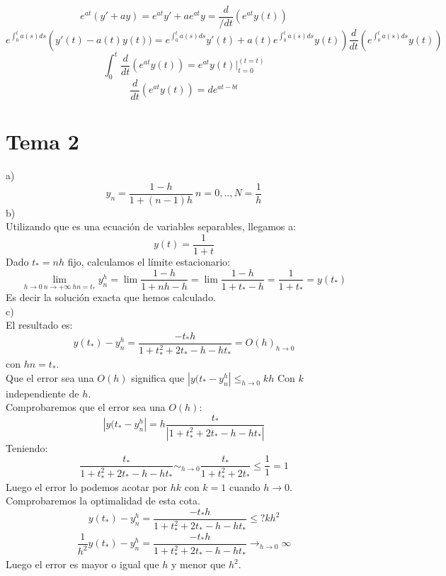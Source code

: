 \documentclass[openany]{book}
\begin{document}
    \setcounter{ex}{8}

    \begin{exercise}
        $$ e^{at}(y'+ay) = e^{at}y' + ae^{at}y = \dfrac{d}{/dt}(e^{at}y(t)) $$
        $$ e^{\int_{0}^{t}a(s)ds}\left(y'(t)-a(t)y(t)) = e^{\int_{0}^{t}a(s)ds}  y'(t)+a(t)e^{\int_{0}^{t}a(s)ds}y(t) \right) \dfrac{d}{dt}(e^{\int_{0}^{t}a(s)ds}y(t)) $$
        $$ \int_{0}^{t}\dfrac{d}{dt}(e^{at}y(t)) = e^{at}y(t)|_{t=0} ^{(t = t)} $$
        $$ \dfrac{d}{dt}(e^{at}y(t)) = d e^{at-bt} $$
    \end{exercise}

    \chapter{Tema 2}

    

    \setcounter{ex}{7}
    \begin{exercise}
        a)
        $$ y_n = \dfrac{1-h}{1+(n-1)h}\ n = 0,..,N = \dfrac{1}{h}$$
        b)\\
        Utilizando que es una ecuación de variables separables, llegamos a:
        $$ y(t) = \dfrac{1}{1+t}  $$
        Dado $ t_{*}= nh  $ fijo, calculamos el límite estacionario:
        $$ \lim_{h \to 0\ n\to +\infty\ hn = t_{*}}y_{n}^{h}  = \lim \dfrac{1-h}{1+nh-h} = \lim \dfrac{1-h}{1+t_{*}-h} = \dfrac{1}{1+t_{*}} = y(t_{*})$$
        Es decir la solución exacta que hemos calculado.\\
        c)\\
        El resultado es:
        $$ y(t_{*})-y_{n}^h = \dfrac{-t_{*}h}{1+t_{*}^2+2t_{*}-h-ht_{*}} = O(h)_{h \to 0}$$
        con $ hn = t_{*} $.\\
        Que el error sea una $ O(h) $ significa que $ |y(t_{*}-y_{n}^h| \leq_{h\to 0} kh $
        Con $ k $ independiente de $ h $.\\
        Comprobaremos que el error sea una $ O(h) $:
        $$ |y(t_{*}-y_n^h| = h \dfrac{t_{*}}{|1+t_{*}^2+2t_{*}-h-ht_{*}|} $$
        Teniendo:
        $$ \dfrac{t_{*}}{1+t_{*}^2+2t_{*}-h-ht_{*}}\sim _{h\to 0} \dfrac{t_{*}}{1+t_{*}^2+2t_{*}} \leq \dfrac{1}{1} = 1 $$ 
        Luego el error lo podemos acotar por $ hk $ con $ k = 1 $ cuando $ h \to 0 $.\\
        
        Comprobaremos la optimalidad de esta cota.
        $$ y(t_{*})-y_{n}^h = \dfrac{-t_{*}h}{1+t_{*}^2+2t_{*}-h-ht_{*}} \leq ? k h^2 $$
        $$ \dfrac{1}{h^2} y(t_{*})-y_{n}^h = \dfrac{-t_{*}h}{1+t_{*}^2+2t_{*}-h-ht_{*}} \to_{h\to 0} \infty $$
        Luego el error es mayor o igual que $ h $ y menor que $ h^2 $.
        

    \end{exercise}
    
\end{document}
